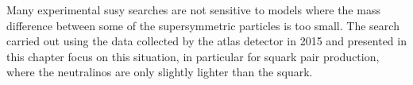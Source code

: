 Many experimental \gls{susy} searches are not sensitive to models where the mass
difference between some of the supersymmetric particles is too small. The search
carried out using the data collected by the \gls{atlas} detector in 2015 and
presented in this chapter focus on this situation, in particular for squark pair
production, where the neutralinos are only slightly lighter than the squark.

